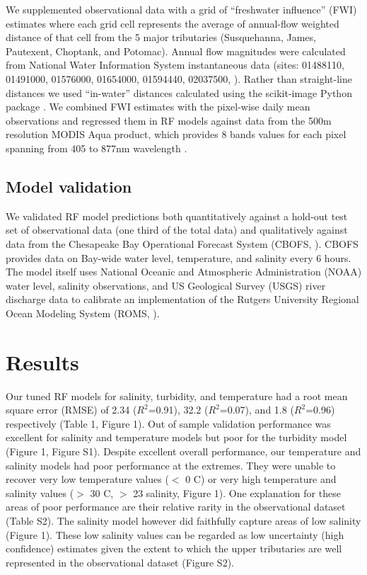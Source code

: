 \documentclass{article}
\begin{document}
We supplemented observational data with a grid of “freshwater influence” (FWI) estimates where each grid cell represents the average of annual-flow weighted distance of that cell from the 5 major tributaries (Susquehanna, James, Pautexent, Choptank, and Potomac). Annual flow magnitudes were calculated from National Water Information System instantaneous data (sites: 01488110, 01491000, 01576000, 01654000, 01594440, 02037500, \citet{nwis2021usgs}). Rather than straight-line distances we used “in-water” distances calculated using the scikit-image Python package \citep{littleKrigingEstuariesCrow1997,vanderwaltScikitimageImageProcessing2014}. We combined FWI estimates with the pixel-wise daily mean observations and regressed them in RF models against data from the 500m resolution MODIS Aqua product, which provides 8 bands values for each pixel spanning from 405 to 877nm wavelength \citep{vermoteericMOD09GAMODISTerra2015}.


\subsection{Model validation}

We validated RF model predictions both quantitatively against a hold-out test set of observational data (one third of the total data) and qualitatively against data from the Chesapeake Bay Operational Forecast System (CBOFS, \citet{lanerolle2011second}). CBOFS provides data on Bay-wide water level, temperature, and salinity every 6 hours. The model itself uses National Oceanic and Atmospheric Administration (NOAA) water level, salinity observations, and US Geological Survey (USGS) river discharge data to calibrate an implementation of the Rutgers University Regional Ocean Modeling System (ROMS, \citet{shchepetkinRegionalOceanicModeling2005}).


\section{Results}

Our tuned RF models for salinity, turbidity, and temperature had a root mean square error (RMSE) of 2.34 ($R^2$=0.91), 32.2 ($R^2$=0.07), and 1.8 ($R^2$=0.96) respectively (Table 1, Figure 1). Out of sample validation performance was excellent for salinity and temperature models but poor for the turbidity model (Figure 1, Figure S1). Despite excellent overall performance, our temperature and salinity models had poor performance at the extremes. They were unable to recover very low temperature values ($<$ 0 C) or very high temperature and salinity values ($>$ 30 C, $>$ 23 salinity, Figure 1). One explanation for these areas of poor performance are their relative rarity in the observational dataset (Table S2). The salinity model however did faithfully capture areas of low salinity (Figure 1). These low salinity values can be regarded as low uncertainty (high confidence) estimates given the extent to which the upper tributaries are well represented in the observational dataset (Figure S2).
\end{document}
